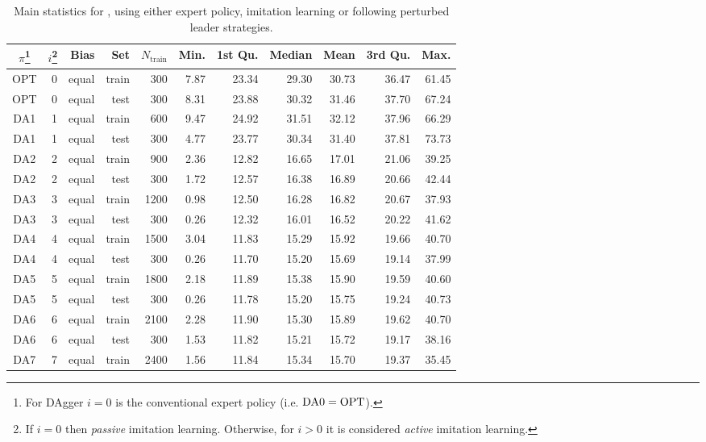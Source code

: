 \begin{table}[t]
\caption{Main statistics for  \namerho, using either expert
   policy, imitation learning or following perturbed leader 
   strategies.}\label{tbl:IL:stats} 
\noindent
\begin{minipage}{\textwidth}
\centering
\footnotesize
\begin{tabular}{c@{}rrrrrrrrrr}
  \toprule
  $\pi$\footnote{For DAgger $i=0$ is the conventional expert policy (i.e. 
  $\text{DA}0=\text{OPT}$).}
  & $i$\footnote{If $i=0$ then \emph{passive} imitation learning. 
  Otherwise, for $i>0$ it is considered \emph{active} imitation learning.}
  & Bias & Set & $N_{\text{train}}$ & Min. & 1st Qu. & Median & 
  Mean & 3rd Qu. & Max. \\ 
  \midrule  
 OPT & 0 & equal & train & 300 & 7.87 & 23.34 & 29.30 & 30.73 & 36.47 & 61.45 \\ 
 OPT & 0 & equal & test & 300 & 8.31 & 23.88 & 30.32 & 31.46 & 37.70 & 67.24 \\ 
 DA1 & 1 & equal & train & 600 & 9.47 & 24.92 & 31.51 & 32.12 & 37.96 & 66.29 \\ 
 DA1 & 1 & equal & test & 300 & 4.77 & 23.77 & 30.34 & 31.40 & 37.81 & 73.73 \\ 
 DA2 & 2 & equal & train & 900 & 2.36 & 12.82 & 16.65 & 17.01 & 21.06 & 39.25 \\ 
 DA2 & 2 & equal & test & 300 & 1.72 & 12.57 & 16.38 & 16.89 & 20.66 & 42.44 \\ 
 DA3 & 3 & equal & train & 1200 & 0.98 & 12.50 & 16.28 & 16.82 & 20.67 & 37.93 \\ 
 DA3 & 3 & equal & test & 300 & 0.26 & 12.32 & 16.01 & 16.52 & 20.22 & 41.62 \\ 
 DA4 & 4 & equal & train & 1500 & 3.04 & 11.83 & 15.29 & 15.92 & 19.66 & 40.70 \\ 
 DA4 & 4 & equal & test & 300 & 0.26 & 11.70 & 15.20 & 15.69 & 19.14 & 37.99 \\ 
 DA5 & 5 & equal & train & 1800 & 2.18 & 11.89 & 15.38 & 15.90 & 19.59 & 40.60 \\ 
 DA5 & 5 & equal & test & 300 & 0.26 & 11.78 & 15.20 & 15.75 & 19.24 & 40.73 \\ 
 DA6 & 6 & equal & train & 2100 & 2.28 & 11.90 & 15.30 & 15.89 & 19.62 & 40.70 \\ 
 DA6 & 6 & equal & test & 300 & 1.53 & 11.82 & 15.21 & 15.72 & 19.17 & 38.16 \\ 
 DA7 & 7 & equal & train & 2400 & 1.56 & 11.84 & 15.34 & 15.70 & 19.37 & 35.45 \\ 

\end{tabular}
\end{minipage}
\end{table}
